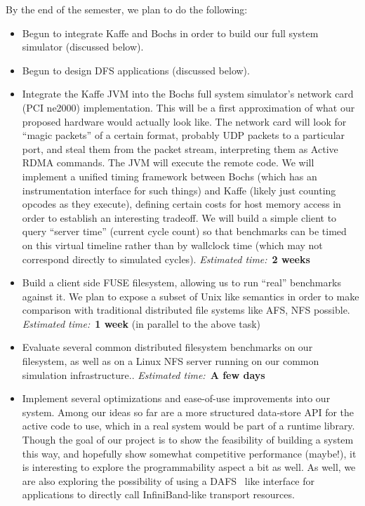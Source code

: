 \documentclass[10pt]{article}
\begin{document}
By the end of the semester, we plan to do the following:

\begin{itemize}

\item Begun to integrate Kaffe and Bochs in order to build our full
  system simulator (discussed below).
  \item Begun to design DFS applications (discussed below).

\item Integrate the Kaffe JVM into the Bochs full system simulator's
  network card (PCI ne2000) implementation. This will be a first
  approximation of what our proposed hardware would actually look
  like. The network card will look for ``magic packets'' of a certain
  format, probably UDP packets to a particular port, and steal them
  from the packet stream, interpreting them as Active RDMA
  commands. The JVM will execute the remote code. We will implement a
  unified timing framework between Bochs (which has an instrumentation
  interface for such things) and Kaffe (likely just counting opcodes
  as they execute), defining certain costs for host memory access in
  order to establish an interesting tradeoff. We will build a simple
  client to query ``server time'' (current cycle count) so that
  benchmarks can be timed on this virtual timeline rather than by
  wallclock time (which may not correspond directly to simulated
  cycles). \emph{Estimated time:}~\textbf{2 weeks}

\item Build a client side FUSE filesystem, allowing us to run
  ``real'' benchmarks against it. We plan to expose a subset
  of Unix like semantics in order to make comparison with
  traditional distributed file systems like AFS, NFS possible.
  \emph{Estimated time:}~\textbf{1 week} (in parallel to the above task)

\item Evaluate several common distributed filesystem benchmarks on our
  filesystem, as well as on a Linux NFS server running on our common
  simulation infrastructure.. \emph{Estimated time:}~\textbf{A few
    days}

\item Implement several optimizations and ease-of-use improvements
  into our system. Among our ideas so far are a more structured
  data-store API for the active code to use, which in a real system
  would be part of a runtime library. Though the goal of our project
  is to show the feasibility of building a system this way, and
  hopefully show somewhat competitive performance (maybe!), it is
  interesting to explore the programmability aspect a bit as well. As
  well, we are also exploring the possibility of using a
  DAFS~\cite{DAFS} like interface for applications to directly call
  InfiniBand-like transport resources.

\end{itemize}
\end{document}
